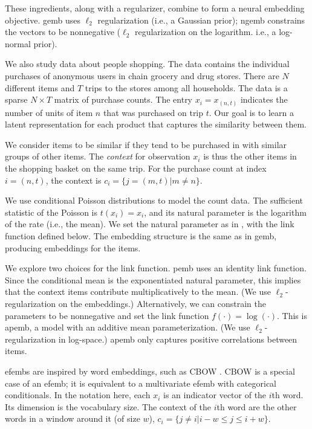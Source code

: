 \documentclass[12pt]{article}
\begin{document}
These ingredients, along with a regularizer, combine to form a neural
embedding objective. \gls{gemb} uses $\ell_2$ regularization (i.e., a
Gaussian prior); \gls{ngemb} constrains the vectors to be nonnegative
($\ell_2$ regularization on the logarithm. i.e., a log-normal prior).

We also study data about people shopping. The data contains the
individual purchases of anonymous users in chain grocery and drug
stores. There are $N$ different items and $T$ trips to the stores
among all households. The data is a sparse $N\times T$ matrix of
purchase counts. The entry $x_{i}=x_{(n,t)}$ indicates the number of
units of item $n$ that was purchased on trip $t$. Our goal is to learn
a latent representation for each product that captures the similarity
between them.

We consider items to be similar if they tend to be purchased in with
similar groups of other items. The \textit{context} for observation
$x_{i}$ is thus the other items in the shopping basket on the same
trip. For the purchase count at index $i=(n,t)$, the context is
$c_i = \{ j=(m,t) | m\neq n\}$.

We use conditional Poisson distributions to model%
the count data. The sufficient statistic of the Poisson is
$t(x_{i})= x_{i}$, and its natural parameter is the logarithm of the
rate (i.e., the mean). We set the natural parameter as in
, with the link function defined below. The
embedding structure is the same as in \gls{gemb}, 
producing embeddings for the items.

We explore two choices for the link function. \gls{pemb} uses an
identity link function. Since the conditional mean is the
exponentiated natural parameter, this implies that the context items
contribute multiplicatively to the mean. (We use
$\ell_2$-regularization on the embeddings.)  Alternatively, we can
constrain the parameters to be nonnegative and set the link function
$f(\cdot)=\log(\cdot)$.  This is \gls{apemb}, a model with an additive
mean parameterization.  (We use $\ell_2$-regularization 
in log-space.) \gls{apemb} only captures positive
correlations between items.

\glspl{efemb} are inspired by word embeddings, such as \gls{CBOW}
\citep{mikolov2013efficient}. \gls{CBOW} is a special case of an
\gls{efemb}; it is equivalent to a multivariate \gls{efemb} with
categorical conditionals. In the notation here, each $x_i$ is an
indicator vector of the $i$th word. Its dimension is the vocabulary
size. The context of the $i$th word are the other words in a window
around it (of size $w$), $c_i = \{j\neq i | i-w \leq j \leq i+w \}$.
\end{document}
